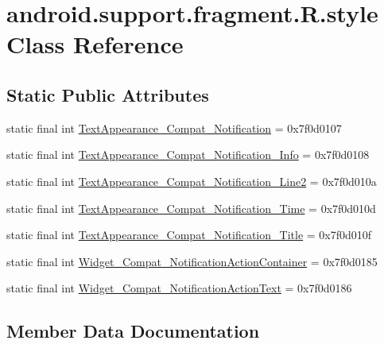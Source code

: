 \hypertarget{classandroid_1_1support_1_1fragment_1_1R_1_1style}{}\section{android.\+support.\+fragment.\+R.\+style Class Reference}
\label{classandroid_1_1support_1_1fragment_1_1R_1_1style}
\subsection*{Static Public Attributes}
\begin{DoxyCompactItemize}
\item 
static final int \mbox{\hyperlink{classandroid_1_1support_1_1fragment_1_1R_1_1style_a75fd23171c1ec5a2afe8446cb68e7a8e}{Text\+Appearance\+\_\+\+Compat\+\_\+\+Notification}} = 0x7f0d0107
\item 
static final int \mbox{\hyperlink{classandroid_1_1support_1_1fragment_1_1R_1_1style_ad4e6951457d9f69a3a436c3c41038340}{Text\+Appearance\+\_\+\+Compat\+\_\+\+Notification\+\_\+\+Info}} = 0x7f0d0108
\item 
static final int \mbox{\hyperlink{classandroid_1_1support_1_1fragment_1_1R_1_1style_aad1cfd960bd97d348aaaab6a879784ad}{Text\+Appearance\+\_\+\+Compat\+\_\+\+Notification\+\_\+\+Line2}} = 0x7f0d010a
\item 
static final int \mbox{\hyperlink{classandroid_1_1support_1_1fragment_1_1R_1_1style_aeae65b00bad78c015474cfa32b793cde}{Text\+Appearance\+\_\+\+Compat\+\_\+\+Notification\+\_\+\+Time}} = 0x7f0d010d
\item 
static final int \mbox{\hyperlink{classandroid_1_1support_1_1fragment_1_1R_1_1style_af5cf680a4640942a5f8d9c1847399047}{Text\+Appearance\+\_\+\+Compat\+\_\+\+Notification\+\_\+\+Title}} = 0x7f0d010f
\item 
static final int \mbox{\hyperlink{classandroid_1_1support_1_1fragment_1_1R_1_1style_a2606c8d408b662743352ce596f5f5e82}{Widget\+\_\+\+Compat\+\_\+\+Notification\+Action\+Container}} = 0x7f0d0185
\item 
static final int \mbox{\hyperlink{classandroid_1_1support_1_1fragment_1_1R_1_1style_a144bc7c25f26c31617e761b0d0ffc4a5}{Widget\+\_\+\+Compat\+\_\+\+Notification\+Action\+Text}} = 0x7f0d0186
\end{DoxyCompactItemize}


\subsection{Member Data Documentation}
\mbox{\label{classandroid_1_1support_1_1fragment_1_1R_1_1style_a75fd23171c1ec5a2afe8446cb68e7a8e}} 
